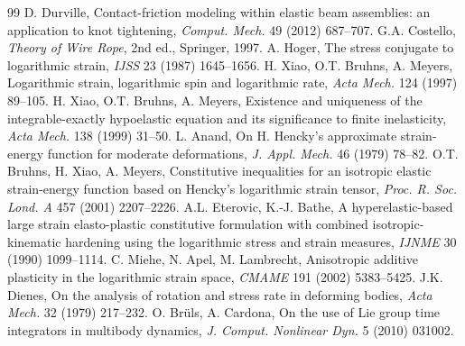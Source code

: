 \documentclass[11pt,a4paper]{article}
\begin{document}
\begin{thebibliography}{99}
 D. Durville, Contact-friction modeling within elastic beam assemblies: an application to knot tightening, \emph{Comput. Mech.} 49 (2012) 687--707.
 G.A. Costello, \emph{Theory of Wire Rope}, 2nd ed., Springer, 1997.
 A. Hoger, The stress conjugate to logarithmic strain, \emph{IJSS} 23 (1987) 1645--1656.
 H. Xiao, O.T. Bruhns, A. Meyers, Logarithmic strain, logarithmic spin and logarithmic rate, \emph{Acta Mech.} 124 (1997) 89--105.
 H. Xiao, O.T. Bruhns, A. Meyers, Existence and uniqueness of the integrable-exactly hypoelastic equation and its significance to finite inelasticity, \emph{Acta Mech.} 138 (1999) 31--50.
 L. Anand, On H. Hencky's approximate strain-energy function for moderate deformations, \emph{J. Appl. Mech.} 46 (1979) 78--82.
 O.T. Bruhns, H. Xiao, A. Meyers, Constitutive inequalities for an isotropic elastic strain-energy function based on Hencky's logarithmic strain tensor, \emph{Proc. R. Soc. Lond. A} 457 (2001) 2207--2226.
 A.L. Eterovic, K.-J. Bathe, A hyperelastic-based large strain elasto-plastic constitutive formulation with combined isotropic-kinematic hardening using the logarithmic stress and strain measures, \emph{IJNME} 30 (1990) 1099--1114.
 C. Miehe, N. Apel, M. Lambrecht, Anisotropic additive plasticity in the logarithmic strain space, \emph{CMAME} 191 (2002) 5383--5425.
 J.K. Dienes, On the analysis of rotation and stress rate in deforming bodies, \emph{Acta Mech.} 32 (1979) 217--232.
 O. Brüls, A. Cardona, On the use of Lie group time integrators in multibody dynamics, \emph{J. Comput. Nonlinear Dyn.} 5 (2010) 031002.
\end{thebibliography}
\end{document}
